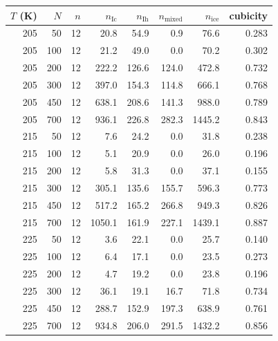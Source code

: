 \begin{tabular}{rrrrrrrr}
\hline
$T$ (K) & $N$ & $n$ & $n_{\mathrm{Ic}}$ & $n_{\mathrm{Ih}}$ & $n_{\mathrm{mixed}}$ & $n_{\mathrm{ice}}$ & cubicity \\
\hline
205 & 50 & 12 & 20.8 & 54.9 & 0.9 & 76.6 & 0.283 \\
205 & 100 & 12 & 21.2 & 49.0 & 0.0 & 70.2 & 0.302 \\
205 & 200 & 12 & 222.2 & 126.6 & 124.0 & 472.8 & 0.732 \\
205 & 300 & 12 & 397.0 & 154.3 & 114.8 & 666.1 & 0.768 \\
205 & 450 & 12 & 638.1 & 208.6 & 141.3 & 988.0 & 0.789 \\
205 & 700 & 12 & 936.1 & 226.8 & 282.3 & 1445.2 & 0.843 \\
215 & 50 & 12 & 7.6 & 24.2 & 0.0 & 31.8 & 0.238 \\
215 & 100 & 12 & 5.1 & 20.9 & 0.0 & 26.0 & 0.196 \\
215 & 200 & 12 & 5.8 & 31.3 & 0.0 & 37.1 & 0.155 \\
215 & 300 & 12 & 305.1 & 135.6 & 155.7 & 596.3 & 0.773 \\
215 & 450 & 12 & 517.2 & 165.2 & 266.8 & 949.3 & 0.826 \\
215 & 700 & 12 & 1050.1 & 161.9 & 227.1 & 1439.1 & 0.887 \\
225 & 50 & 12 & 3.6 & 22.1 & 0.0 & 25.7 & 0.140 \\
225 & 100 & 12 & 6.4 & 17.1 & 0.0 & 23.5 & 0.273 \\
225 & 200 & 12 & 4.7 & 19.2 & 0.0 & 23.8 & 0.196 \\
225 & 300 & 12 & 36.1 & 19.1 & 16.7 & 71.8 & 0.734 \\
225 & 450 & 12 & 288.7 & 152.9 & 197.3 & 638.9 & 0.761 \\
225 & 700 & 12 & 934.8 & 206.0 & 291.5 & 1432.2 & 0.856 \\
\hline
\end{tabular}
